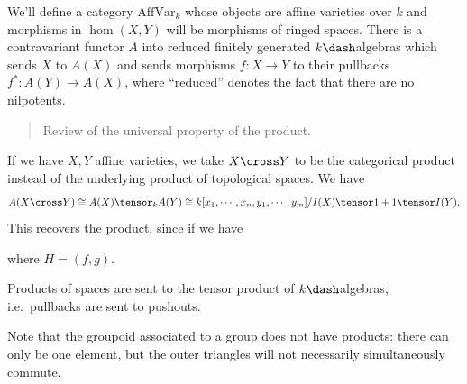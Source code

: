 We'll define a category \(\mathrm{AffVar}_k\) whose objects are affine
varieties over \(k\) and morphisms in \(\hom(X, Y)\) will be morphisms
of ringed spaces. There is a contravariant functor \(A\) into reduced
finitely generated \(k\dash\)algebras which sends \(X\) to \(A(X)\) and
sends morphisms \(f:X\to Y\) to their pullbacks \(f^*:A(Y) \to A(X)\),
where ``reduced'' denotes the fact that there are no nilpotents.

\begin{quote}
Review of the universal property of the product.
\end{quote}

\begin{remark}

If we have \(X,Y\) affine varieties, we take \(X\cross Y\) to be the
categorical product instead of the underlying product of topological
spaces. We have
\begin{align*}
A(X\cross Y) \cong A(X) \tensor_k A(Y) \cong k[x_1, \cdots, x_n, y_1, \cdots, y_m] / I(X) \tensor 1 + 1 \tensor I(Y).\end{align*}
This recovers the product, since if we have

\begin{center}\end{center}

where \(H = (f, g)\).

\end{remark}

\begin{remark}

Products of spaces are sent to the tensor product of \(k\dash\)algebras,
i.e.~pullbacks are sent to pushouts.

\end{remark}

\begin{remark}

Note that the groupoid associated to a group does not have products:
there can only be one element, but the outer triangles will not
necessarily simultaneously commute.

\end{remark}

